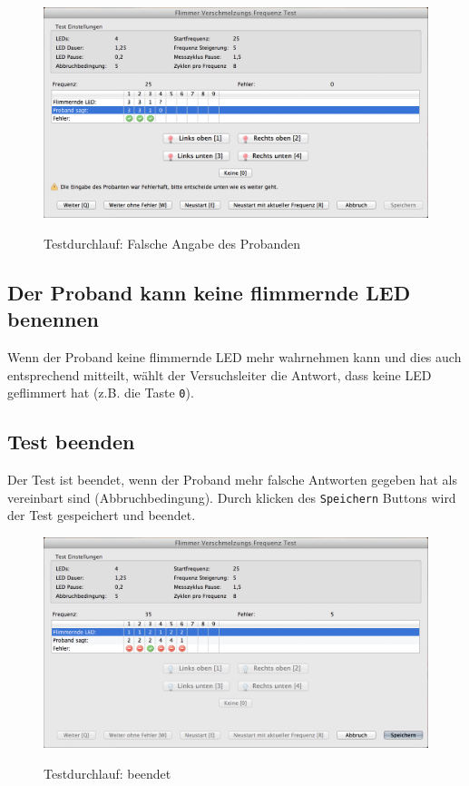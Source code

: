 \documentclass[11pt,accentcolor=tud2a,colorback,noheadingspace,bigchapter]{tudreport}
\begin{document}
\begin{figure}[H]
	\centering
	\includegraphics[width=\textwidth]{testrunner_wronganswer.png}
	\label{fig:testrunner-waiting}
	\caption{Testdurchlauf: Falsche Angabe des Probanden}
\end{figure}

\subsection{Der Proband kann keine flimmernde LED benennen}
\label{tests:der-proband-kann-keine-flimmernde-led-benennen}
Wenn der Proband keine flimmernde LED mehr wahrnehmen kann und dies auch entsprechend mitteilt, wählt der Versuchsleiter die Antwort, dass keine LED geflimmert hat (z.B. die Taste \texttt{0}).


\subsection{Test beenden}
\label{tests:test-beenden}
Der Test ist beendet, wenn der Proband mehr falsche Antworten gegeben hat als vereinbart sind (Abbruchbedingung). Durch klicken des \texttt{Speichern} Buttons wird der Test gespeichert und beendet.

\begin{figure}[H]
	\centering
	\includegraphics[width=\textwidth]{testrunner_finished.png}
	\label{fig:testrunner-finished}
	\caption{Testdurchlauf: beendet}
\end{figure}
\end{document}
